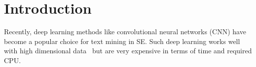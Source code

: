 \documentclass[sigconf]{acmart}
\theoremstyle{break}
\begin{document}
%
%





\maketitle

 \section{Introduction}
    \label{sect:intro}
   Recently, deep learning methods like   convolutional neural networks (CNN) have
   become a   popular choice for text mining in SE. Such   deep learning works well with high dimensional data~\cite{mou2016convolutional} but are very expensive in terms of time and required CPU.
  
\end{document}
